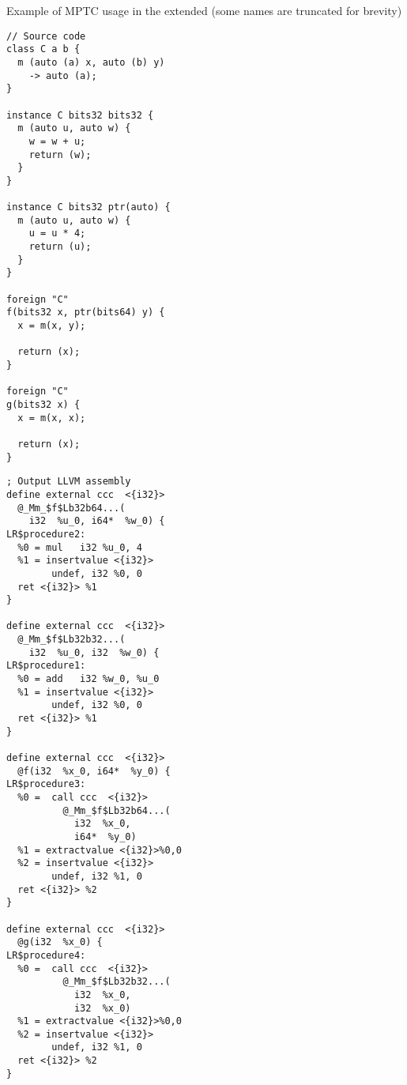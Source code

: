 \begin{codex}
    \small
    \caption{Example of MPTC usage in the extended \cmm (some names are truncated for brevity)}
    \label{lst:mptcs}
    \begin{center}
    \begin{minipage}{0.5\linewidth}
    \begin{lstlisting}[basicstyle=\scriptsize\ttfamily]
// Source code
class C a b {
  m (auto (a) x, auto (b) y)
    -> auto (a);
}

instance C bits32 bits32 {
  m (auto u, auto w) {
    w = w + u;
    return (w);
  }
}

instance C bits32 ptr(auto) {
  m (auto u, auto w) {
    u = u * 4;
    return (u);
  }
}

foreign "C"
f(bits32 x, ptr(bits64) y) {
  x = m(x, y);

  return (x);
}

foreign "C"
g(bits32 x) {
  x = m(x, x);

  return (x);
}
    \end{lstlisting}
    \end{minipage}%
    \begin{minipage}{0.5\linewidth}
    \begin{lstlisting}[style=llvmStyle, basicstyle=\scriptsize\ttfamily]
; Output LLVM assembly
define external ccc  <{i32}>
  @_Mm_$f$Lb32b64...(
    i32  %u_0, i64*  %w_0) {
LR$procedure2:
  %0 = mul   i32 %u_0, 4
  %1 = insertvalue <{i32}>
        undef, i32 %0, 0
  ret <{i32}> %1
}

define external ccc  <{i32}>
  @_Mm_$f$Lb32b32...(
    i32  %u_0, i32  %w_0) {
LR$procedure1:
  %0 = add   i32 %w_0, %u_0
  %1 = insertvalue <{i32}>
        undef, i32 %0, 0
  ret <{i32}> %1
}

define external ccc  <{i32}>
  @f(i32  %x_0, i64*  %y_0) {
LR$procedure3:
  %0 =  call ccc  <{i32}>
          @_Mm_$f$Lb32b64...(
            i32  %x_0,
            i64*  %y_0)
  %1 = extractvalue <{i32}>%0,0
  %2 = insertvalue <{i32}>
        undef, i32 %1, 0
  ret <{i32}> %2
}

define external ccc  <{i32}>
  @g(i32  %x_0) {
LR$procedure4:
  %0 =  call ccc  <{i32}>
          @_Mm_$f$Lb32b32...(
            i32  %x_0,
            i32  %x_0)
  %1 = extractvalue <{i32}>%0,0
  %2 = insertvalue <{i32}>
        undef, i32 %1, 0
  ret <{i32}> %2
}
    \end{lstlisting}
    \end{minipage}
    \end{center}
\end{codex}

